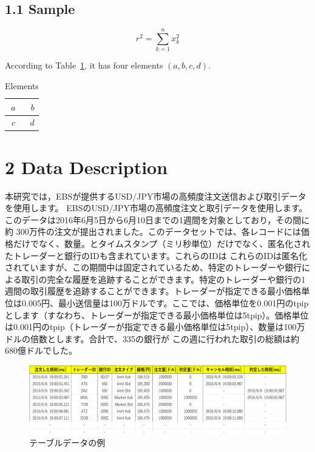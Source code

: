 \documentclass[a4paper,11pt,oneside,openany]{book}
\begin{document}
\section*{1.1 Sample}


\begin{equation}
  r^2 = \sum_{k=1}^{n} x_k^2 \label{eq:hs}
\end{equation}


According to Table~\ref{tab:sample}, it has four elements $(a, b, c, d)$.
\begin{table}[htb]
  \centering
  \caption{Elements}\label{tab:sample}
  \begin{tabular}{|c|r|}
    \hline
    $a$ & $b$ \\ \hline
    $c$ & $d$ \\ \hline
  \end{tabular}
\end{table}


\chapter{2 Data Description}
本研究では，EBSが提供するUSD/JPY市場の高頻度注文送信および取引データを使用します。 EBSのUSD/JPY市場の高頻度注文と取引データを使用します。このデータは2016年6月5日から6月10日までの1週間を対象としており，その間に約 300万件の注文が提出されました。このデータセットでは、各レコードには価格だけでなく、数量。とタイムスタンプ（ミリ秒単位）だけでなく、匿名化されたトレーダーと銀行のIDも含まれています。これらのIDは これらのIDは匿名化されていますが、この期間中は固定されているため、特定のトレーダーや銀行による取引の完全な履歴を追跡することができます。特定のトレーダーや銀行の1週間の取引履歴を追跡することができます。トレーダーが指定できる最小価格単位は0.005円、最小送信量は100万ドルです。ここでは、価格単位を0.001円のtpipとします（すなわち、トレーダーが指定できる最小価格単位は5tpip）。価格単位は0.001円のtpip（トレーダーが指定できる最小価格単位は5tpip）、数量は100万ドルの倍数とします。合計で、335の銀行が この週に行われた取引の総額は約680億ドルでした。
\begin{figure}[htb]
  \centering
  \includegraphics[scale=0.7]{./figures/table_data.png}
  \caption{テーブルデータの例}\label{fig:hs}
\end{figure}
\end{document}
